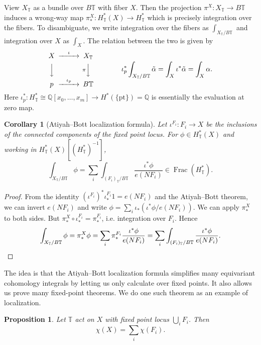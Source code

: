 \documentclass{report}
\theoremstyle{plain}
\newtheorem{proposition}[theorem]{Proposition}
\newtheorem{corollary}[theorem]{Corollary}
\theoremstyle{definition}
\theoremstyle{remark}
\newcommand{\bT}{\mathbb{T}}
\newcommand{\bQ}{\mathbb{Q}}
\DeclareMathOperator{\Frac}{Frac}
\newcommand{\pt}{\mathrm{pt}}
\begin{document}
View $X_{\bT}$ as a bundle over $B\bT$ with fiber $X$. Then the
projection $\pi^X\colon X_{\bT} \to B\bT$ induces a wrong-way map
$\pi^X_*\colon H^*_{\bT}(X) \to H^*_{\bT}$ which is precisely
integration over the fibers. To disambiguate, we write integration
over the fibers as $\int_{X_{\bT}/B\bT}$ and integration over $X$ as
  $\int_X$. The relation between the two is given by
\begin{equation} \label{eq:equivariant-vs-ordinary-cohomology}
  \begin{CD}
    X @>\iota>> X_{\bT} \\
    @VVV  @V\pi VV \\
    p @>\iota_p>> B\bT
  \end{CD} \qquad\qquad
  \iota^*_p\int_{X_{\bT}/B\bT} \tilde{\alpha} = \int_X \iota^*\tilde{\alpha} = \int_X \alpha.
\end{equation}
Here $\iota^*_p\colon H^*_{\bT} \cong \bQ[x_0, \ldots, x_m] \to
H^*(\{\pt\}) = \bQ$ is essentially the evaluation at zero map.

\begin{corollary}[Atiyah--Bott localization formula] \label{thm:equiv-localization}
  Let $\iota^{F_i}\colon F_i \to X$ be the inclusions of the connected
  components of the fixed point locus. For $\phi \in H_{\bT}^*(X)$
  and working in $H^*_{\bT}(X)[(H^*_{\bT})^{-1}]$,
  \[ \int_{X_{\bT}/B\bT} \phi = \sum_i \int_{(F_i)_{\bT}/B\bT} \frac{\iota^* \phi}{e(NF_i)} \in \Frac(H^*_{\bT}). \]
\end{corollary}

\begin{proof}
  From the identity $(\iota^{F_i})^* \iota^{F_i}_* 1 = e(NF_i)$ and
  the Atiyah--Bott theorem, we can invert $e(NF_i)$ and write $\phi =
  \sum_i \iota_*(\iota^* \phi/e(NF_i))$. We can apply $\pi^X_*$ to
  both sides. But $\pi^X_* \circ \iota^{F_i}_* = \pi^{F_i}_*$, i.e.
  integration over $F_i$. Hence
  \[ \int_{X_{\bT}/B\bT} \phi = \pi^X_*\phi = \sum_i \pi^{F_i}_* \frac{\iota^*\phi}{e(NF_i)} = \sum_i \int_{(F_i)_{\bT}/B\bT} \frac{\iota^*\phi}{e(NF_i)}. \qedhere \]
\end{proof}

The idea is that the Atiyah--Bott localization formula simplifies many
equivariant cohomology integrals by letting us only calculate over
fixed points. It also allows us prove many fixed-point theorems. We do
one such theorem as an example of localization.

\begin{proposition}
  Let $\bT$ act on $X$ with fixed point locus $\bigcup_i F_i$. Then
  \[ \chi(X) = \sum_i \chi(F_i). \]
\end{proposition}
\end{document}
